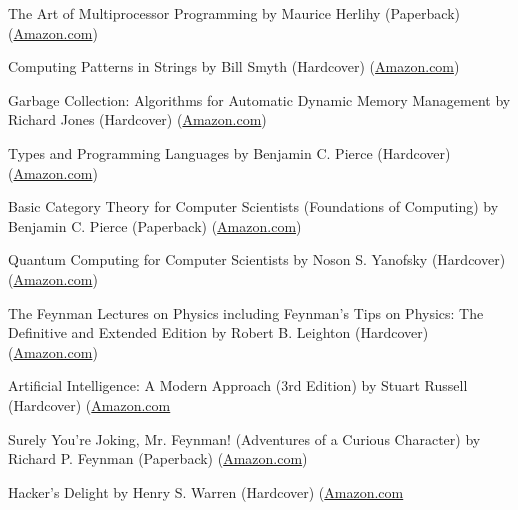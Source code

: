 \documentclass[10pt]{article}
\newenvironment{innerlist}[1][\enskip\textbullet]%
        {\begin{compactitem}[#1]}{\end{compactitem}}
\begin{document}
\begin{innerlist}
                \item The Art of Multiprocessor Programming
                  by Maurice Herlihy (Paperback)
                  (\href{http://www.amazon.com/Art-Multiprocessor-Programming-Maurice-Herlihy/dp/0123705916}{Amazon.com})
                \item Computing Patterns in Strings
                  by Bill Smyth (Hardcover)
                  (\href{http://www.amazon.com/Computing-Patterns-Strings-William-Smyth/dp/0201398397}{Amazon.com})
                \item Garbage Collection: Algorithms for Automatic Dynamic Memory Management
                  by Richard Jones (Hardcover)
                  (\href{http://www.amazon.com/Garbage-Collection-Algorithms-Automatic-Management/dp/0471941484}{Amazon.com})

                \item Types and Programming Languages
                  by Benjamin C. Pierce (Hardcover)
                  (\href{http://www.amazon.com/Types-Programming-Languages-Benjamin-Pierce/dp/0262162091}{Amazon.com})
                \item Basic Category Theory for Computer Scientists (Foundations of Computing)
                  by Benjamin C. Pierce (Paperback)
                  (\href{http://www.amazon.com/Category-Computer-Scientists-Foundations-Computing/dp/0262660717}{Amazon.com})

		\item Quantum Computing for Computer Scientists
                  by Noson S. Yanofsky (Hardcover)
                  (\href{http://www.amazon.com/Quantum-Computing-Computer-Scientists-Yanofsky/dp/0521879965}{Amazon.com})
                \item The Feynman Lectures on Physics including Feynman's Tips on Physics: The Definitive and Extended Edition
                  by Robert B. Leighton (Hardcover)
                  (\href{http://www.amazon.com/Feynman-Lectures-Physics-including-Feynmans/dp/0805390456}{Amazon.com})

                \item Artificial Intelligence: A Modern Approach (3rd Edition)
                  by Stuart Russell (Hardcover)
                  (\href{http://www.amazon.com/Artificial-Intelligence-Modern-Approach-3rd/dp/0136042597}{Amazon.com}

                \item Surely You're Joking, Mr. Feynman! (Adventures of a Curious Character)
                  by Richard P. Feynman (Paperback)
                  (\href{http://www.amazon.com/Surely-Feynman-Adventures-Curious-Character/dp/0393316041}{Amazon.com})
                \item Hacker's Delight
                  by Henry S. Warren (Hardcover)
                  (\href{http://www.amazon.com/Hackers-Delight-Henry-S-Warren/dp/0201914654}{Amazon.com}
	\end{innerlist}
\end{document}
